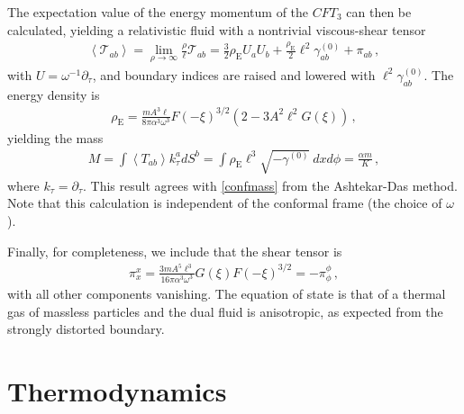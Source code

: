 \documentclass[
twoside,
openright,
frontopenright,
]{dmathesis}
\newcommand{\tcr}{\textcolor{red}}
\begin{document}
The expectation value of the energy momentum of the $CFT_{3}$ can then be
calculated, yielding a relativistic fluid with a nontrivial viscous-shear
tensor
\begin{align}
\left\langle \mathcal{T}_{ab}\right\rangle =\lim_{\rho \to
\infty }\frac{\rho }{\ell}\mathcal{T}_{ab}= \frac32 \rho _{\mathrm{E}}
U_{a}U_{b}+\frac{\rho_\mathrm{E}}2 \ell^{2} \gamma^{(0)} _{ab}+\pi _{ab}\,,
\end{align}
with $U=\omega^{-1}\partial_\tau$, and boundary indices are
raised and lowered with $\ell^{2}\gamma^{(0)}_{ab}$.
The energy density is
\begin{align}
\rho _{\mathrm{E}}= \frac{mA^3\ell}{8\pi \alpha^3\omega^3}F(-\xi)^{3/2}
(2-3A^{2}\ell^{2}G(\xi))\,,
\end{align}
yielding the mass
\begin{align}
M= \int \left\langle T_{ab}\right\rangle k_\tau^a dS^b = \int \rho _{\mathrm{E}} \ell^3 \sqrt{-\gamma^{(0)}}~dxd\phi
=\frac{\alpha m}{K}\,,
\end{align}
where $k_\tau = \partial_\tau$. This result agrees with \cref{confmass} from the
Ashtekar-Das method. Note that this calculation is independent of the conformal
frame (the choice of $\omega$).

Finally, for completeness, we include that the shear tensor is
\begin{align}
\pi^x_x= \frac{3mA^5\ell^3}{16\pi \alpha^3\omega^{3}}
G(\xi)F(-\xi)^{3/2}=-\pi^\phi_\phi\,,
\end{align}
with all other components vanishing. The equation of state is that of a thermal
gas of massless particles and the dual fluid is anisotropic, as expected from
the strongly distorted boundary.

\section{Thermodynamics}
\label{sec:thermodynamics}
\end{document}
